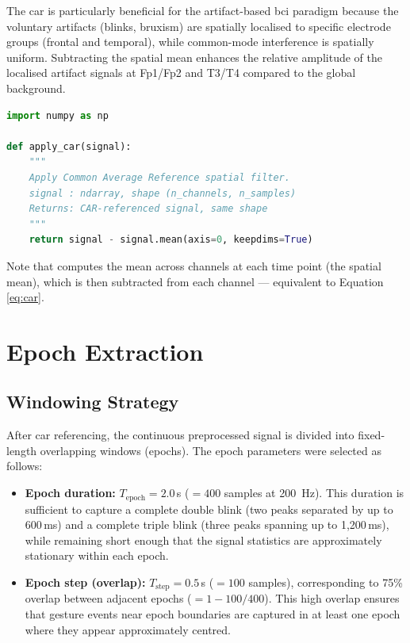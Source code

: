 The \acrshort{car} is particularly beneficial for the
artifact-based \acrshort{bci} paradigm because the voluntary
artifacts (blinks, bruxism) are spatially localised to specific
electrode groups (frontal and temporal), while common-mode
interference is spatially uniform. Subtracting the spatial
mean enhances the relative amplitude of the localised artifact
signals at Fp1/Fp2 and T3/T4 compared to the global background.

\begin{lstlisting}[language=Python,
    caption={Common Average Reference implementation.},
    label={lst:car}]
import numpy as np

def apply_car(signal):
    """
    Apply Common Average Reference spatial filter.
    signal : ndarray, shape (n_channels, n_samples)
    Returns: CAR-referenced signal, same shape
    """
    return signal - signal.mean(axis=0, keepdims=True)
\end{lstlisting}

Note that  computes the mean across
channels at each time point (the spatial mean), which is then
subtracted from each channel — equivalent to Equation
\eqref{eq:car}.

\section{Epoch Extraction}
\label{sec:sp_epoch}

\subsection{Windowing Strategy}

After \acrshort{car} referencing, the continuous preprocessed
signal is divided into fixed-length overlapping windows
(epochs). The epoch parameters were selected as follows:

\begin{itemize}[leftmargin=*]
    \item \textbf{Epoch duration:} $T_{\text{epoch}} =
    2.0$\,s ($= 400$ samples at \SI{200}{\hertz}). This
    duration is sufficient to capture a complete double blink
    (two peaks separated by up to 600\,ms) and a complete
    triple blink (three peaks spanning up to 1{,}200\,ms),
    while remaining short enough that the signal statistics
    are approximately stationary within each epoch.

    \item \textbf{Epoch step (overlap):} $T_{\text{step}} =
    0.5$\,s ($= 100$ samples), corresponding to 75\% overlap
    between adjacent epochs ($= 1 - 100/400$). This high
    overlap ensures that gesture events near epoch boundaries
    are captured in at least one epoch where they appear
    approximately centred.
\end{itemize}


